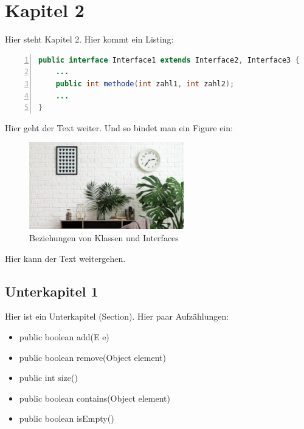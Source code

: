 \documentclass[fontsize=12pt,paper=a4,open=any,parskip=half,
  twoside=false,toc=listof,toc=bibliography,fleqn,leqno,
  captions=nooneline,captions=tableabove,british]{scrbook}
\begin{document}
\chapter{Kapitel 2}\label{ch:interfaces}
Hier steht Kapitel 2. Hier kommt ein Listing:
\begin{lstlisting}[language=Java,
					caption={Deklaration eines Interfaces},
					backgroundcolor = \color{lightgray},
					captionpos=b,
					numbers=left,
					keywordstyle=\color{RoyalBlue},
    				rulecolor=\color{black},
   		 			upquote=true, 
					showstringspaces=false,
    				breaklines=true,
    				frame=single,
					aboveskip=2em,
					label={interface-deklaration},
]
public interface Interface1 extends Interface2, Interface3 {
	...
	public int methode(int zahl1, int zahl2);
	...
}
\end{lstlisting}
\captionsetup{justification=centering,margin=2cm}

Hier geht der Text weiter. Und so bindet man ein Figure ein:

\begin{figure}[htbp]
 \centering
 \includegraphics[width=0.6\textwidth]{bildname}
 \captionsetup{justification=centering,margin=2cm}
 \caption{Beziehungen von Klassen und Interfaces \autocite{jtpinterface}}
 \label{interface-relation}
\end{figure}

Hier kann der Text weitergehen.


\section{Unterkapitel 1}\label{sec:c.f}
Hier ist ein Unterkapitel (Section). Hier paar Aufzählungen:

\begin{itemize}
 \item public boolean add(E e) 
 \item public boolean remove(Object element)
 \item public int size()
 \item public boolean contains(Object element)
 \item public boolean isEmpty()
\end{itemize}
\end{document}
